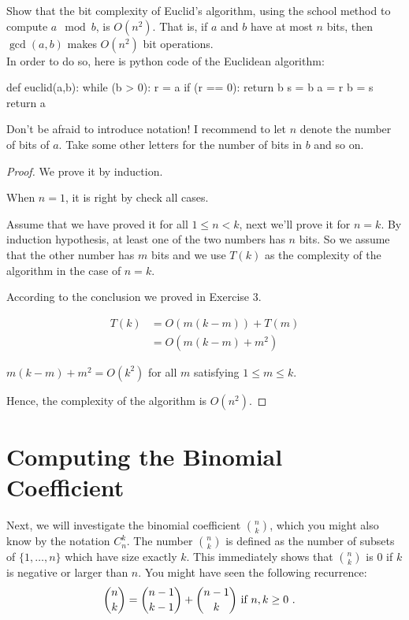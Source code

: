 \documentclass[11pt,a4paper,oneside]{article}
\begin{document}
\begin{problem}{2}
\statement
Show that the bit complexity of Euclid's algorithm, using the school method
to compute $a \mod b$, is $O(n^2)$. That is,
if $a$ and $b$ have at most $n$ bits, then $\gcd(a,b)$ makes $O(n^2)$ bit operations.\\

In order to do so, here is python code of the Euclidean algorithm:
\begin{python}
def euclid(a,b):
	while (b > 0):
		r = a %
		if (r == 0):
			return b
		s = b %
		a = r
		b = s
  	return a
\end{python}
Don't be afraid to introduce notation! I recommend to let $n$ denote the number of bits of $a$.
Take some other letters for the number of bits in $b$ and so on.
\solution
\begin{proof}
	
We prove it by induction.

When \(n = 1\), it is right by check all cases.

Assume that we have proved it for all \(1 \leq n < k \), next we'll prove it for \( n=k\). By induction hypothesis, at least one of the two numbers has \(n \) bits. So we assume that the other number has \(m \) bits and we use \(T(k)\) as the complexity of the algorithm in the case of \(n=k\).

According to the conclusion we proved in Exercise 3.

\[
	\begin{split}
		T(k) &= O(m(k - m)) + T(m) \\
		&= O(m(k-m) + m^2)
	\end{split}
\]

\( m(k - m) + m^2 = O(k^2)\) for all \(m\) satisfying \(1 \leq m \leq k\).

Hence, the complexity of the algorithm is \(O(n^2)\).

\end{proof}
\end{problem}
\section*{Computing the Binomial Coefficient}

    Next, we will investigate the binomial coefficient ${n \choose k}$, which 
    you might also know by the notation $C^k_n$. The number ${n \choose k}$ is defined
    as the number of subsets of $\{1,\dots,n\}$ which have size exactly $k$. 
    This immediately shows that ${n \choose k}$ is $0$ if $k$ is negative or larger than $n$.
    You might have seen the following recurrence:
    \begin{align*}
     {n \choose k} & = {n-1 \choose k-1} + {n-1 \choose k} \textnormal{ if } n,k \geq 0 \ .
    \end{align*}
\end{document}
